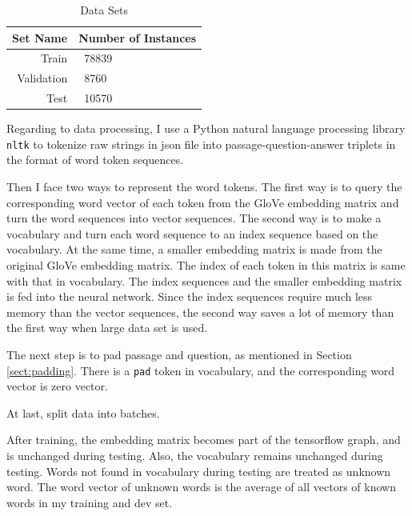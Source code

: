 \documentclass[modernstyle,12pt]{sjsuthesis}
\theoremstyle{definition}
\begin{document}
\begin{table}[htbp]\centering
  \caption{Data Sets}
  \label{tab:dataset}
  \begin{tabular}{|r|l|} \hline
    Set Name & Number of Instances \\ \hline\hline
    Train & \ 78839 \\
    Validation & \ 8760 \\
    Test & \ 10570 \\ \hline
  \end{tabular}
\end{table}

Regarding to data processing, I use a Python natural language processing library {\tt nltk} to tokenize raw strings in json file into passage-question-answer triplets in the format of word token sequences.

Then I face two ways to represent the word tokens. The first way is to query the corresponding word vector of each token from the GloVe embedding matrix and turn the word sequences into vector sequences.  The second way is to make a vocabulary and turn each word sequence to an index sequence based on the vocabulary. At the same time, a smaller embedding matrix is made from the original GloVe embedding matrix. The index of each token in this matrix is same with that in vocabulary. The index sequences and the smaller embedding matrix is fed into the neural network. Since the index sequences require much less memory than the vector sequences, the second way saves a lot of memory than the first way when large data set is used.


The next step is to pad passage and question, as mentioned in Section \ref{sect:padding}. There is a {\tt pad} token in vocabulary, and the corresponding word vector is zero vector.

At last, split data into batches.

After training, the embedding matrix becomes part of the tensorflow graph, and is unchanged during testing. Also, the vocabulary remains unchanged during testing. Words not found in vocabulary during testing are treated as unknown word. The word vector of unknown words is the average of all vectors of known words in my training and dev set.
\end{document}
